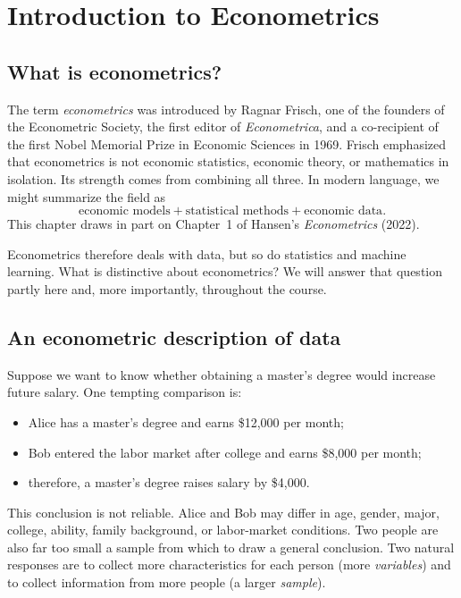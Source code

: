 \chapter{Introduction to Econometrics}
\label{ch:intro}

\section{What is econometrics?}

The term \emph{econometrics} was introduced by Ragnar Frisch, one of the
founders of the Econometric Society, the first editor of \emph{Econometrica},
and a co-recipient of the first Nobel Memorial Prize in Economic Sciences in
1969.  Frisch emphasized that econometrics is not economic statistics,
economic theory, or mathematics in isolation.  Its strength comes from
combining all three.  In modern language, we might summarize the field as
\[
  \text{economic models}+\text{statistical methods}+\text{economic data}.
\]
This chapter draws in part on Chapter~1 of Hansen's \emph{Econometrics}
(2022).

Econometrics therefore deals with data, but so do statistics and machine
learning.  What is distinctive about econometrics?  We will answer that
question partly here and, more importantly, throughout the course.

\section{An econometric description of data}

Suppose we want to know whether obtaining a master's degree would increase
future salary.  One tempting comparison is:
\begin{itemize}
  \item Alice has a master's degree and earns \$12,000 per month;
  \item Bob entered the labor market after college and earns \$8,000 per
        month;
  \item therefore, a master's degree raises salary by \$4,000.
\end{itemize}
This conclusion is not reliable.  Alice and Bob may differ in age, gender,
major, college, ability, family background, or labor-market conditions.  Two
people are also far too small a sample from which to draw a general
conclusion.  Two natural responses are to collect more characteristics for
each person (more \emph{variables}) and to collect information from more
people (a larger \emph{sample}).


